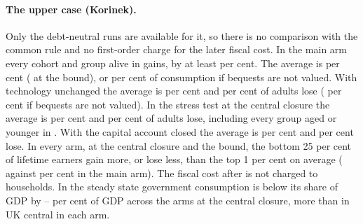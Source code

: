 \paragraph{The upper case (Korinek).} Only the debt-neutral runs are available for it, so there is no comparison with the common rule and no first-order charge for the later fiscal cost. In the main arm every cohort and group alive in \genShockYear{} gains, by at least \genCohKorMainDnCentralMinAbs{} per cent. The average is \genCohKorMainDnCentralAvg{} per cent (\genCohKorMainDnBoundAvg{} at the bound), or \genCohKorMainDnCentralNoBeqAvg{} per cent of consumption if bequests are not valued. With technology unchanged the average is \genCohKorFlatDnCentralAvg{} per cent and \genCohKorFlatDnCentralLosingPct{} per cent of adults lose (\genCohKorFlatDnCentralNoBeqLosingPct{} per cent if bequests are not valued). In the stress test at the central closure the average is \genCohKorStressDnCentralAvg{} per cent and \genCohKorStressDnCentralLosingPct{} per cent of adults lose, including every group aged \genCohKorStressDnCentralAllLoseUpToAge{} or younger in \genShockYear{}. With the capital account closed the average is \genCohKorStressDnBoundAvg{} per cent and \genCohKorStressDnBoundLosingPct{} per cent lose. In every arm, at the central closure and the bound, the bottom 25 per cent of lifetime earners gain more, or lose less, than the top 1 per cent on average (\genCohKorMainDnCentralBottom{} against \genCohKorMainDnCentralTopOne{} per cent in the main arm). The fiscal cost after \genLastFlowYear{} is not charged to households. In the steady state government consumption is below its share of GDP by \genCohKorDnCentralGShortSsPctGdpMin--\genCohKorDnCentralGShortSsPctGdpMax{} per cent of GDP across the arms at the central closure, more than in UK central in each arm.
